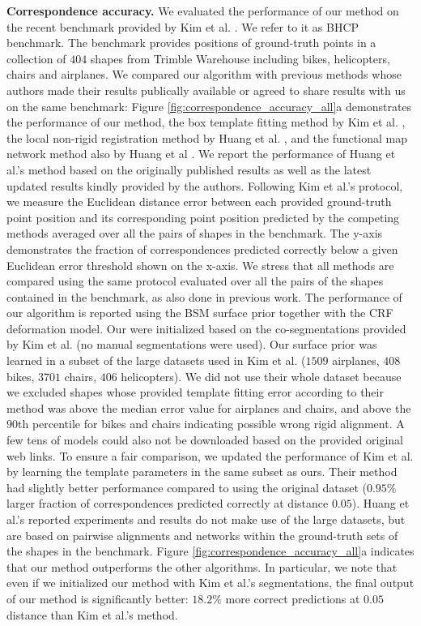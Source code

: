 \textbf{Correspondence accuracy.} We evaluated the performance of our method on the recent benchmark provided by Kim et al. . We refer to it as BHCP benchmark. The benchmark provides positions of ground-truth points in a collection of $404$ shapes from Trimble Warehouse including bikes, helicopters, chairs and airplanes. We compared our algorithm with previous methods whose authors made their results publically available or agreed to share results with us on the same benchmark: Figure \ref{fig:correspondence_accuracy_all}a demonstrates the performance of our method, the box template fitting method by Kim et al. , the local non-rigid registration method by Huang et al. , and the functional map network method also by Huang et al \cite{Huang14}. We report the performance of Huang et al.'s method  based on the originally published results as well as the latest updated results kindly provided by the authors. Following Kim et al.'s protocol, we measure the Euclidean distance error between each provided ground-truth point position and its corresponding point position predicted by the competing methods averaged over all the pairs of shapes in the benchmark. The y-axis demonstrates the fraction of correspondences predicted correctly below a given Euclidean error threshold shown on the x-axis. We stress that all methods are compared using the same protocol evaluated over all the pairs of the shapes contained in the benchmark, as also done in previous work. The performance of our algorithm is reported using the BSM surface prior together with the CRF deformation model. Our  were initialized based on the co-segmentations provided by Kim et al. (no manual segmentations were used). Our surface prior was learned in a subset of the large datasets used in Kim et al. ($1509$ airplanes, $408$ bikes, $3701$ chairs, $406$ helicopters). We did not use their whole dataset because we excluded shapes whose provided template fitting error according to their method was above the median error value for airplanes and chairs, and above the $90$th percentile for bikes and chairs indicating possible wrong rigid alignment. A few tens of models could also not be downloaded based on the provided original web links. To ensure a fair comparison, we updated the performance of Kim et al. by learning the template parameters in the same subset as ours. Their method had slightly better performance compared to using the original dataset ($0.95\%$ larger fraction of correspondences predicted correctly at distance $0.05$). Huang et al.'s reported experiments and results do not make use of the large datasets, but are based on pairwise alignments and networks within the ground-truth sets of the shapes in the benchmark. Figure \ref{fig:correspondence_accuracy_all}a indicates that our method outperforms the other algorithms. In particular, we note that even if we initialized our method with Kim et al.'s segmentations, the final output of our method is significantly better: $18.2\%$ more correct predictions at $0.05$ distance than Kim et al.'s method. 

